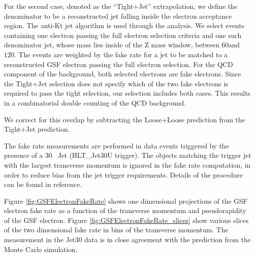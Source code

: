 \documentclass{cmspaper}
\begin{document}
For the second case, denoted as the ``Tight+Jet'' extrapolation, we define the denominator to be a reconstructed jet falling inside the electron acceptance region. The anti-Kt jet algorithm is used through the analysis. We select events containing one electron passing the full electron selection criteria and one such denominator jet, whose mass lies inside of the Z mass window, between $60$\GeVcc and $120$\GeVcc. The events are weighted by the fake rate for a jet to be matched to a reconstructed GSF electron passing the full electron selection. For the QCD component of the background, both selected electrons are fake electrons. Since the Tight+Jet selection does not specify which of the two fake electrons is required to pass the tight selection, our selection includes both cases. This results in a combinatorial double counting of the QCD background. 

We correct for this overlap by subtracting the Loose+Loose prediction from the Tight+Jet prediction.



The fake rate measurements are performed in data events triggered by the presence of a $30$ \GeV\ Jet (HLT\_Jet30U trigger). The objects matching the trigger jet with the largest transverse momentum is ignored in the fake rate computation, in order to reduce bias from the jet trigger requirements. Details of the procedure can be found in reference\cite{FakeRateNote}. 

Figure \ref{fig:GSFElectronFakeRate} shows one dimensional projections of the GSF electron fake rate as a function of the transverse momentum and pseudorapidity of the GSF electron. Figure \ref{fig:GSFElectronFakeRate_slices} show various slices of the two dimensional fake rate in bins of the transverse momentum. The measurement in the Jet30 data is in close agreement with the prediction from the Monte Carlo simulation.
\end{document}
